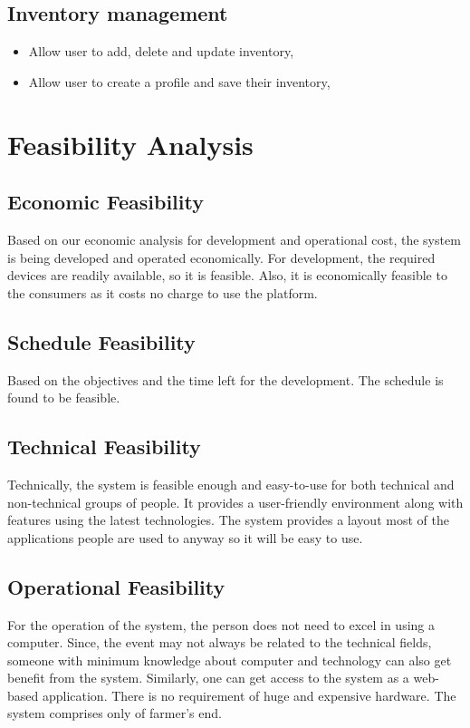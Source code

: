 \subsection{Inventory management}
 \vspace{-18pt}
 \begin{itemize}
	\item Allow user to add, delete and update inventory,  
	\item Allow user to create a profile and save their inventory,
\end{itemize}

\section{Feasibility Analysis}

\subsection{Economic Feasibility}
Based on our economic analysis for development and operational cost, 
the system is being developed and operated economically. For development, 
the required devices are readily available, so it is feasible. Also, 
it is economically feasible to the consumers as it costs no charge to use the platform.

\subsection{Schedule Feasibility}
Based on the objectives and the time left for the development. 
The schedule is found to be feasible.

\subsection{Technical Feasibility}
Technically, the system is feasible enough and easy-to-use 
for both technical and non-technical groups of people. It provides 
a user-friendly environment along with features using the latest technologies. 
The system provides a layout most of the applications people are used to anyway 
so it will be easy to use.

\subsection{Operational Feasibility}
For the operation of the system, the person does 
not need to excel in using a computer. Since, the event 
may not always be related to the technical fields, someone 
with minimum knowledge about computer and technology can also get 
benefit from the system. Similarly, one can get access to the system 
as a web-based application. There is no requirement of huge and expensive hardware. 
The system comprises only of farmer’s end. 

